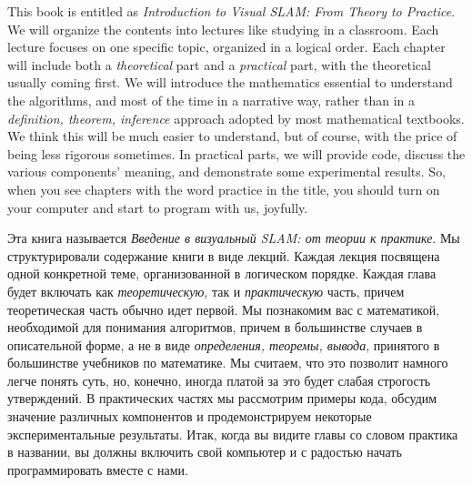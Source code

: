 \begin{English}
    This book is entitled as \textit{Introduction to Visual SLAM: From Theory to Practice}. We will organize the contents into lectures like studying in a classroom. Each lecture focuses on one specific topic, organized in a logical order. Each chapter will include both a \textit{theoretical} part and a \textit{practical} part, with the theoretical usually coming first. We will introduce the mathematics essential to understand the algorithms, and most of the time in a narrative way, rather than in a \textit{definition, theorem, inference} approach adopted by most mathematical textbooks. We think this will be much easier to understand, but of course, with the price of being less rigorous sometimes. In practical parts, we will provide code, discuss the various components' meaning, and demonstrate some experimental results. So, when you see chapters with the word practice in the title, you should turn on your computer and start to program with us, joyfully.
\end{English}

\begin{Russian}
    Эта книга называется \textit{Введение в визуальный SLAM: от теории к практике}. Мы структурировали содержание книги в виде лекций. Каждая лекция посвящена одной конкретной теме, организованной в логическом порядке. Каждая глава будет включать как \textit{теоретическую}, так и \textit{практическую} часть, причем теоретическая часть обычно идет первой. Мы познакомим вас с математикой, необходимой для понимания алгоритмов, причем в большинстве случаев в описательной форме, а не в виде \textit{определения, теоремы, вывода}, принятого в большинстве учебников по математике. Мы считаем, что это позволит намного легче понять суть, но, конечно, иногда платой за это будет слабая строгость утверждений. В практических частях мы рассмотрим примеры кода, обсудим значение различных компонентов и продемонстрируем некоторые экспериментальные результаты. Итак, когда вы видите главы со словом практика в названии, вы должны включить свой компьютер и с радостью начать программировать вместе с нами. 
\end{Russian}

